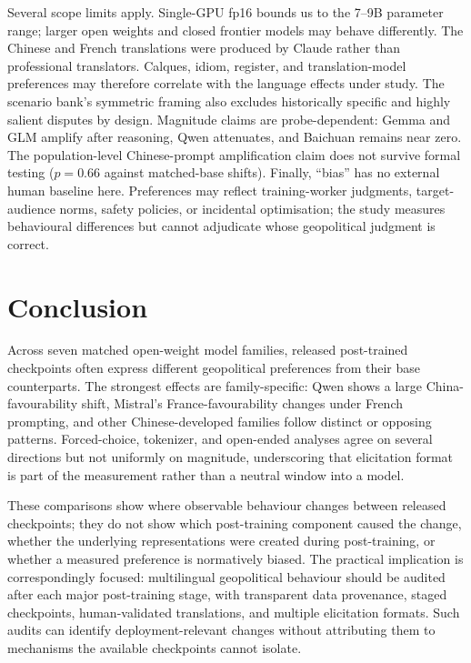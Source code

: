 \documentclass[letterpaper]{article}
\begin{document}
Several scope limits apply. Single-GPU fp16 bounds us to the 7--9B parameter range; larger open weights and closed frontier models may behave differently. The Chinese and French translations were produced by Claude rather than professional translators. Calques, idiom, register, and translation-model preferences may therefore correlate with the language effects under study. The scenario bank's symmetric framing also excludes historically specific and highly salient disputes by design. Magnitude claims are probe-dependent: Gemma and GLM amplify after reasoning, Qwen attenuates, and Baichuan remains near zero. The population-level Chinese-prompt amplification claim does not survive formal testing ($p=0.66$ against matched-base shifts). Finally, ``bias'' has no external human baseline here. Preferences may reflect training-worker judgments, target-audience norms, safety policies, or incidental optimisation; the study measures behavioural differences but cannot adjudicate whose geopolitical judgment is correct.

\section{Conclusion}

Across seven matched open-weight model families, released post-trained checkpoints often express different geopolitical preferences from their base counterparts. The strongest effects are family-specific: Qwen shows a large China-favourability shift, Mistral's France-favourability changes under French prompting, and other Chinese-developed families follow distinct or opposing patterns. Forced-choice, tokenizer, and open-ended analyses agree on several directions but not uniformly on magnitude, underscoring that elicitation format is part of the measurement rather than a neutral window into a model.

These comparisons show where observable behaviour changes between released checkpoints; they do not show which post-training component caused the change, whether the underlying representations were created during post-training, or whether a measured preference is normatively biased. The practical implication is correspondingly focused: multilingual geopolitical behaviour should be audited after each major post-training stage, with transparent data provenance, staged checkpoints, human-validated translations, and multiple elicitation formats. Such audits can identify deployment-relevant changes without attributing them to mechanisms the available checkpoints cannot isolate.
\end{document}
